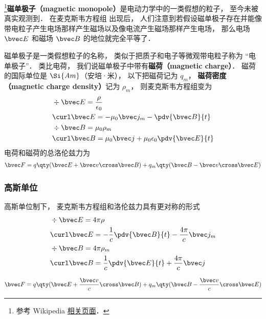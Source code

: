 

\footnote{参考 Wikipedia \href{https://en.wikipedia.org/wiki/Magnetic_monopole}{相关页面}．}\textbf{磁单极子（magnetic monopole）}是电动力学中的一类假想的粒子， 至今未被真实观测到． 在麦克斯韦方程组 出现后， 人们注意到若假设磁单极子存在并能像带电粒子产生电场那样产生磁场以及像电流产生磁场那样产生电场， 那么电场 $\bvec E$ 和磁场 $\bvec B$ 的地位就完全平等了．

磁单极子是一类假想粒子的名称， 类似于把质子和电子等微观带电粒子称为 “电单极子”． 类比电荷， 我们说磁单极子中带有\textbf{磁荷（magnetic charge）}． 磁荷的国际单位是 $\Si{Am}$（安培·米）， 以下把磁荷记为 $q_m$， \textbf{磁荷密度（magnetic charge density）}记为 $\rho_m$， 则麦克斯韦方程组变为
\begin{equation}
\begin{aligned}
&\div \bvec E = \frac{\rho}{\epsilon_0}\\
&\curl \bvec E = - \mu_0 \bvec j_m -\pdv{\bvec B}{t}\\
&\div \bvec B = \mu_0 \rho_m \\
&\curl \bvec B = \mu_0 \bvec j + \mu_0\epsilon_0 \pdv{\bvec E}{t}
\end{aligned}
\end{equation}
电荷和磁荷的总洛伦兹力为
\begin{align}
\bvec F = q \qty(\bvec E + \bvec v \cross \bvec B) +
q_m \qty(\bvec B - \bvec v \cross \bvec E)
\end{align}

\subsubsection{高斯单位}
高斯单位制下， 麦克斯韦方程组和洛伦兹力具有更对称的形式
\begin{equation}\label{BMono_eq1}
\begin{aligned}
&\div \bvec E = 4\pi\rho\\
&\curl \bvec E = -\frac{1}{c}\pdv{\bvec B}{t}  - \frac{4\pi}{c}\bvec j_m\\
&\div \bvec B = 4\pi\rho_m \\
&\curl \bvec B = \frac{1}{c}\pdv{\bvec E}{t} + \frac{4\pi}{c} \bvec j
\end{aligned}
\end{equation}

\begin{equation}
\bvec F = q \qty(\bvec E + \frac{\bvec v}{c}\cross \bvec B) + q_m \qty(\bvec B - \frac{\bvec v}{c}\cross \bvec E)
\end{equation}
